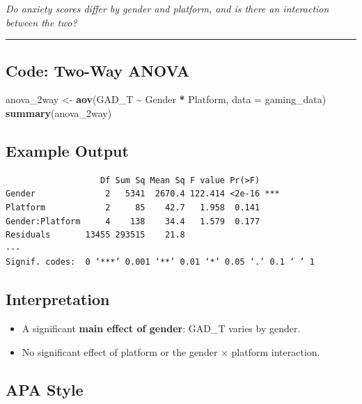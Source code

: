 \documentclass[
]{book}
\newenvironment{Shaded}{\begin{snugshade}}{\end{snugshade}}
\newcommand{\AttributeTok}[1]{\textcolor[rgb]{0.13,0.29,0.53}{#1}}
\newcommand{\FunctionTok}[1]{\textcolor[rgb]{0.13,0.29,0.53}{\textbf{#1}}}
\newcommand{\NormalTok}[1]{#1}
\newcommand{\OtherTok}[1]{\textcolor[rgb]{0.56,0.35,0.01}{#1}}
\newcommand{\SpecialCharTok}[1]{\textcolor[rgb]{0.81,0.36,0.00}{\textbf{#1}}}
\providecommand{\tightlist}{%
  \setlength{\itemsep}{0pt}\setlength{\parskip}{0pt}}
\begin{document}
\emph{Do anxiety scores differ by gender and platform, and is there an interaction between the two?}

\begin{center}\rule{0.5\linewidth}{0.5pt}\end{center}

\subsection{Code: Two-Way ANOVA}\label{code-two-way-anova}

\begin{Shaded}
\begin{Highlighting}[]
\NormalTok{anova\_2way }\OtherTok{\textless{}{-}} \FunctionTok{aov}\NormalTok{(GAD\_T }\SpecialCharTok{\textasciitilde{}}\NormalTok{ Gender }\SpecialCharTok{*}\NormalTok{ Platform, }\AttributeTok{data =}\NormalTok{ gaming\_data)}
\FunctionTok{summary}\NormalTok{(anova\_2way)}
\end{Highlighting}
\end{Shaded}

\subsection{Example Output}\label{example-output}

\begin{verbatim}
                   Df Sum Sq Mean Sq F value Pr(>F)    
Gender              2   5341  2670.4 122.414 <2e-16 ***
Platform            2     85    42.7   1.958  0.141    
Gender:Platform     4    138    34.4   1.579  0.177    
Residuals       13455 293515    21.8                   
---
Signif. codes:  0 ‘***’ 0.001 ‘**’ 0.01 ‘*’ 0.05 ‘.’ 0.1 ‘ ’ 1
\end{verbatim}

\subsection{Interpretation}\label{interpretation-4}

\begin{itemize}
\tightlist
\item
  A significant \textbf{main effect of gender}: GAD\_T varies by gender.
\item
  No significant effect of platform or the gender × platform interaction.
\end{itemize}

\subsection{APA Style}\label{apa-style-2}
\end{document}
